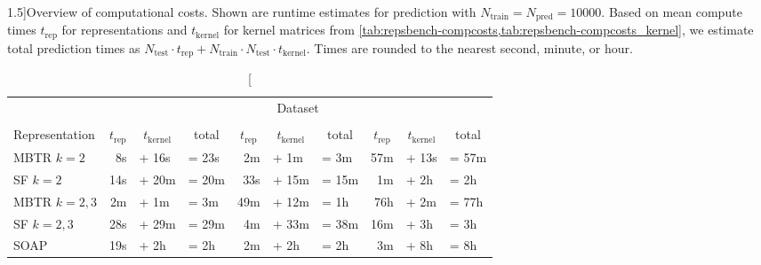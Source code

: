 \begin{table*}
	\caption[][1.5\baselineskip]{Overview of computational costs.
		Shown are runtime estimates for prediction with $N_{\text{train}}{=}N_{\text{pred}}{=}\num{10000}$.
		Based on mean compute times $t_{\text{rep}}$ for representations and $t_{\text{kernel}}$ for kernel matrices from \cref{tab:repsbench-compcosts,tab:repsbench-compcosts_kernel}, we estimate total prediction times as $N_{\text{test}} \cdot t_{\text{rep}} + N_{\text{train}} \cdot N_{\text{test}} \cdot t_{\text{kernel}}$.
		Times are rounded to the nearest second, minute, or hour.
		\label{tab:repsbench-total_timing}}
	
		\begin{tabular}{l rll rll rll}
			\toprule
			& \multicolumn{9}{c}{Dataset} \\ \cmidrule(lr){2-10}
			& \multicolumn{3}{c}{\dsgdb} & \multicolumn{3}{c}{\dsba} & \multicolumn{3}{c}{\dstco} \\ \cmidrule(lr){2-4} \cmidrule(lr){5-7} \cmidrule(lr){8-10}
			Representation 
			& \multicolumn{1}{c}{$t_{\text{rep}}$} & \multicolumn{1}{c}{$t_{\text{kernel}}$} & \multicolumn{1}{c}{total} 
			& \multicolumn{1}{c}{$t_{\text{rep}}$} & \multicolumn{1}{c}{$t_{\text{kernel}}$} & \multicolumn{1}{c}{total} 
			& \multicolumn{1}{c}{$t_{\text{rep}}$} & \multicolumn{1}{c}{$t_{\text{kernel}}$} & \multicolumn{1}{c}{total}\\
		\midrule
		MBTR $k{=}2$   & 8s &+ 16s &= 23s & 2m &+ 1m &= 3m & 57m &+ 13s &= 57m \\
		SF $k{=}2$     & 14s &+ 20m &= 20m & 33s &+ 15m &= 15m & 1m &+ 2h &= 2h \\
		MBTR $k{=}2,3$ & 2m &+ 1m &= 3m & 49m &+ 12m &= 1h & 76h &+ 2m &= 77h \\
		SF $k{=}2,3$   & 28s &+ 29m &= 29m & 4m &+ 33m &= 38m & 16m &+ 3h &= 3h \\
		SOAP         & 19s &+ 2h &= 2h & 2m &+ 2h &= 2h & 3m &+ 8h &= 8h \\
		\bottomrule
	\end{tabular}
\end{table*}


